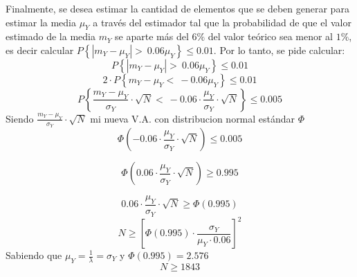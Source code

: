 Finalmente, se desea estimar la cantidad de elementos que se deben generar para estimar la media $\mu_Y$ a través del estimador tal que la probabilidad de que el valor estimado de la media $m_Y$ se aparte más del $6\%$ del valor teórico sea menor al $1\%$, es decir calcular $P\left\lbrace | m_Y - \mu_Y | > \ 0.06 \mu_Y \right\rbrace \leq 0.01$. %
%
Por lo tanto, se pide calcular: 
\begin{equation*}
	P\left\lbrace | m_Y - \mu_Y | > \ 0.06 \mu_Y \right\rbrace \leq 0.01
\end{equation*}
\begin{equation*}
	2\cdot P\left\lbrace m_Y - \mu_Y < \ -0.06 \mu_Y \right\rbrace \leq 0.01
\end{equation*}
\begin{equation*}
	P\left\lbrace  \frac{m_Y - \mu_Y}{\sigma_Y}\cdot \sqrt{N} < \ -0.06 \cdot \frac{\mu_Y}{\sigma_Y}\cdot \sqrt{N} \right\rbrace \leq 0.005
\end{equation*}
Siendo $\frac{m_Y - \mu_Y}{\sigma_Y}\cdot \sqrt{N}$ mi nueva V.A. con distribucion normal estándar $\Phi$
\begin{equation*}
\Phi\left( -0.06 \cdot \frac{\mu_Y}{\sigma_Y}\cdot \sqrt{N} \right) \leq 0.005
\end{equation*}

\begin{equation*}
\Phi\left( 0.06 \cdot \frac{\mu_Y}{\sigma_Y}\cdot \sqrt{N} \right) \geq 0.995
\end{equation*}

\begin{equation*}
 0.06 \cdot \frac{\mu_Y}{\sigma_Y}\cdot \sqrt{N} \geq \Phi \left( 0.995 \right)
\end{equation*}
\begin{equation*}
	N \geq \left[ \Phi \left( 0.995 \right) \cdot \frac{\sigma_Y}{\mu_Y \cdot 0.06}\right]^2
\end{equation*}
Sabiendo que $\mu_Y = \frac{1}{\lambda} = \sigma_Y$ y $\Phi \left( 0.995 \right)=2.576$
\begin{equation}
N \geq 1843 
\end{equation}